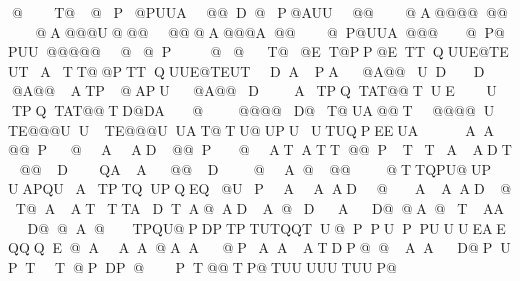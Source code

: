  @       T@ @P @ PUUA  @@  D @P @AUU @ @     @A   @@@ @  @ @     @A   @@@ U@ @ @    @ @@A   @@@ A  @ @     @P   @UU A  @ @@     @P    @ PUU @ @@ @@    @    @  P        @    @         T@  @ET    @ PP                 @ET                                  TQUUE@TEUTA T T@@PT TQUUE@TEUTD AP A  @A@@ UD D   @A@@ ATP@ APU  @A@@ D  A TPQTAT@@TUE UTPQTAT@@T D@DA @  @@@@ D@ T@UA@@T   @@@@                   U TE@@@U                  U TE@@@U                  UAT@T U@UPUUTUQPEEU AAA@@P@A AD @@P@AT AT T@@PT TA ADT@@D  QA A @@D  @A@@@ @T TQPU@UP UAPQUA                                                                TPTQUPQEQ @U  P  AAAD @      A AAD  @     T@  A AT  T TA DT   A@ AD  A@ D  A D@@ A@ T   AAD@@A@     TPQU@P DPTPT UTQQT U     @                                                   P        PUPPUU U EAEQQQE     @AAA@ AA       @PAA AT D    P @@ AA D@P       UPTT @PDP@                                    P     T                                             @  @ T                        P  @                           TUU                            UUU                            TUU                            P                               @                                                                                                                                                                                                                               
